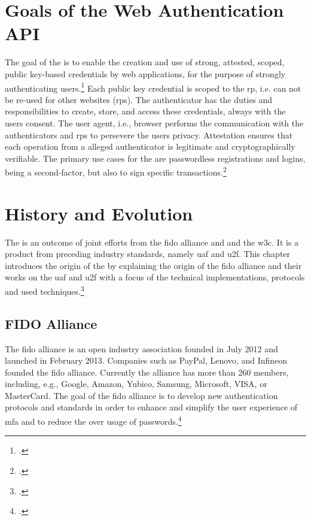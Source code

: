 
\section{Goals of the Web Authentication API}

The goal of the \wa{} is to enable \frqq the creation and use of strong, attested, scoped, public key-based credentials by web applications, for the purpose of strongly authenticating users\flqq.\footcites[][Abstract]{w3c} Each public key credential is scoped to the \gls{rp}, i.e. can not be re-used for other websites (\glspl{rp}). The authenticator has the 	duties and responsibilities to create, store, and access these credentials, always with the users consent. The user agent, i.e., browser performs the communication with the authenticators and \glspl{rp} to persevere the users privacy. Attestation ensures that each operation from a alleged authenticator is legitimate and cryptographically verifiable. The primary use cases for the \wa{} are passwordless registrations and logins, being a second-factor, but also to sign specific transactions.\footcites[See][Abstract, Chapter 1.2]{w3c}

\section{History and Evolution}

The \wa{} is an outcome of joint efforts from the \gls{fido} alliance and and the \gls{w3c}. It is a product from preceding industry standards, namely \gls{uaf} and \gls{u2f}. This chapter introduces the origin of the \wa{} by explaining the origin of the \gls{fido} alliance and their works on the \gls{uaf} and \gls{u2f} with a focus of the technical implementations, protocols and used techniques.\footcites[See][24]{fido-ct-3}

\subsection{FIDO Alliance}
\label{subsec:fido_alliance}

The \gls{fido} alliance is an open industry association founded in July 2012 and launched in February 2013. Companies such as PayPal, Lenovo, and Infineon founded the \gls{fido} alliance. Currently the alliance has more than 260 members, including, e.g., Google, Amazon, Yubico, Samsung, Microsoft, VISA, or MasterCard. The goal of the \gls{fido} alliance is to develop new authentication protocols and standards in order to enhance and simplify the user experience of \gls{mfa} and to reduce the over usage of passwords.\footcites[See][583]{eckert-it-sec-9}[See][17]{fido-ct-2}

